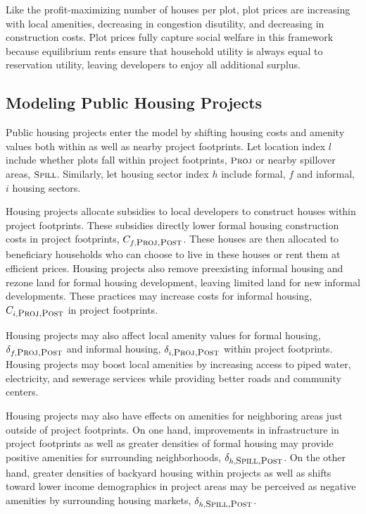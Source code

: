 \documentclass[12pt]{article}
\begin{document}
Like the profit-maximizing number of houses per plot, plot prices are increasing with local amenities, decreasing in congestion disutility, and decreasing in construction costs.  Plot prices fully capture social welfare in this framework because equilibrium rents ensure that household utility is always equal to reservation utility, leaving developers to enjoy all additional surplus. 

\subsection{Modeling Public Housing Projects}

Public housing projects enter the model by shifting housing costs and amenity values both within as well as nearby project footprints.  Let location index $l$ include whether plots fall within project footprints, $\textsc{\small Proj}$ or nearby spillover areas, $\textsc{\small Spill}$.  Similarly, let housing sector index $h$ include formal, $f$ and informal, $i$ housing sectors.

Housing projects allocate subsidies to local developers to construct houses within project footprints.  These subsidies directly lower formal housing construction costs in project footprints, $C_{f,\textsc{\small Proj,Post}}$.  These houses are then allocated to beneficiary households who can choose to live in these houses or rent them at efficient prices.  Housing projects also remove preexisting informal housing and rezone land for formal housing development, leaving limited land for new informal developments.  These practices may increase costs for informal housing, $C_{i,\textsc{\small Proj,Post}}$ in project footprints.

Housing projects may also affect local amenity values for formal housing, $\delta_{f,\textsc{\small Proj,Post}}$ and informal housing, $\delta_{i,\textsc{\small Proj,Post}}$ within project footprints.  Housing projects may boost local amenities by increasing access to piped water, electricity, and sewerage services while providing better roads and community centers.  

Housing projects may also have effects on amenities for neighboring areas just outside of project footprints.  On one hand, improvements in infrastructure in project footprints as well as greater densities of formal housing may provide positive amenities for surrounding neighborhoods, $\delta_{h,\textsc{\small Spill,Post}}$.  On the other hand, greater densities of backyard housing within projects as well as shifts toward lower income demographics in project areas may be perceived as negative amenities by surrounding housing markets, $\delta_{h,\textsc{\small Spill,Post}}$.  
\end{document}

